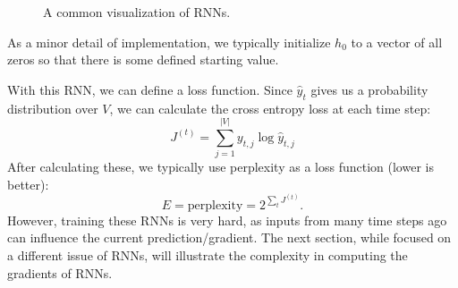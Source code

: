 \begin{figure}
\centering
{}
\caption{A common visualization of RNNs.}
\end{figure}

As a minor detail of implementation, we typically initialize $h_0$ to a vector of all zeros so that there is some defined starting value.

With this RNN, we can define a loss function. Since $\hat{y}_t$ gives us a probability distribution over $V$, we can calculate the cross entropy loss at each time step:
$$J^{(t)} = \sum_{j=1}^{|V|} y_{t,j} \log{\hat{y}_{t,j}}$$
After calculating these, we typically use perplexity as a loss function (lower is better):
$$E = \text{perplexity} = 2^{\sum_t J^{(t)}}.$$
However, training these RNNs is very hard, as inputs from many time steps ago can influence the current prediction/gradient. The next section, while focused on a different issue of RNNs, will illustrate the complexity in computing the gradients of RNNs.


